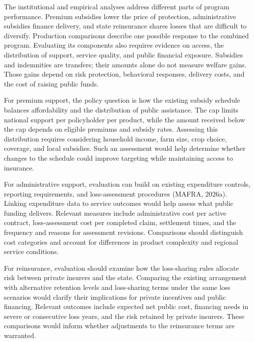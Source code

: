

The institutional and empirical analyses address different parts of program performance. Premium subsidies lower the price of protection, administrative subsidies finance delivery, and state reinsurance shares losses that are difficult to diversify. Production comparisons describe one possible response to the combined program. Evaluating its components also requires evidence on access, the distribution of support, service quality, and public financial exposure. Subsidies and indemnities are transfers; their amounts alone do not measure welfare gains. Those gains depend on risk protection, behavioral responses, delivery costs, and the cost of raising public funds.

For premium support, the policy question is how the existing subsidy schedule balances affordability and the distribution of public assistance. The cap limits national support per policyholder per product, while the amount received below the cap depends on eligible premiums and subsidy rates. Assessing this distribution requires considering household income, farm size, crop choice, coverage, and local subsidies. Such an assessment would help determine whether changes to the schedule could improve targeting while maintaining access to insurance.

For administrative support, evaluation can build on existing expenditure controls, reporting requirements, and loss-assessment procedures (MAFRA, 2026a). Linking expenditure data to service outcomes would help assess what public funding delivers. Relevant measures include administrative cost per active contract, loss-assessment cost per completed claim, settlement times, and the frequency and reasons for assessment revisions. Comparisons should distinguish cost categories and account for differences in product complexity and regional service conditions.

For reinsurance, evaluation should examine how the loss-sharing rules allocate risk between private insurers and the state. Comparing the existing arrangement with alternative retention levels and loss-sharing terms under the same loss scenarios would clarify their implications for private incentives and public financing. Relevant outcomes include expected net public cost, financing needs in severe or consecutive loss years, and the risk retained by private insurers. These comparisons would inform whether adjustments to the reinsurance terms are warranted.

